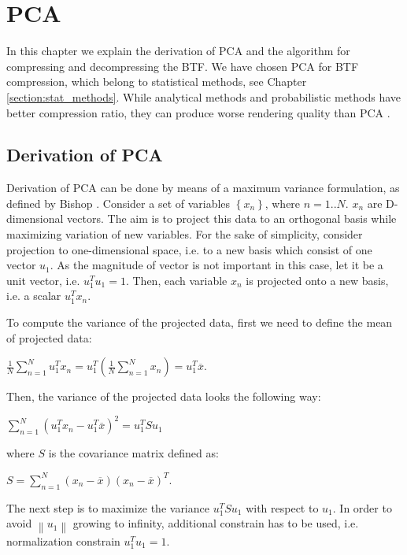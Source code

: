 \chapter{PCA}
\label{section:pca}

In this chapter we explain the derivation of PCA and the algorithm for compressing and decompressing the BTF.
We have chosen PCA for BTF compression, which belong to statistical methods, see Chapter \ref{section:stat_methods}.
While analytical methods and probabilistic methods have better compression ratio, they can produce worse rendering quality than PCA \cite{haindl}.



 \section{Derivation of PCA}
\label{section:derivation_pca}

Derivation of PCA can be done by means of a maximum variance formulation, as defined by Bishop \cite{Bishop}.
 Consider a set of variables $\left \{ x_{n} \right \}$, where $n=1..N$. $x_{n}$ are D-dimensional vectors. The aim is to project this data to an orthogonal basis while maximizing variation of new variables.
For the sake of simplicity, consider projection to one-dimensional space, i.e. to a new basis which consist of one vector $u_{1}$. 
As the magnitude of vector is not important in this case, let it be a unit vector, i.e. $u_{1}^Tu_{1}=1$.
 Then, each variable $x_{n}$ is projected onto a new basis, i.e. a scalar $u_{1}^Tx_{n}$.

 To compute the variance of the projected data, first we need to define the mean of projected data:

{\centering$\tfrac{1}{N}\sum_{n=1}^{N}u_{1}^Tx_{n}=u_{1}^T(\tfrac{1}{N}\sum_{n=1}^{N}x_{n})=u_{1}^T\overline{x}.$\\}

Then, the variance of the projected data looks the following way:

{\centering$\sum_{n=1}^{N}(u_{1}^Tx_{n}-u_{1}^T\overline{x} )^2=u_{1}^TSu_{1}$\\}

where $S$ is the covariance matrix defined as:

{\centering$S=\sum_{n=1}^{N}(x_{n}-\overline{x})(x_{n}-\overline{x})^T.$\\}

The next step is to maximize the variance $u_{1}^TSu_{1}$ with respect to $u_{1}$. In order to avoid $\left \| u_{1} \right \|$ growing to infinity, additional constrain has to be used,
i.e.  normalization constrain $u_{1}^Tu_{1}=1$.

